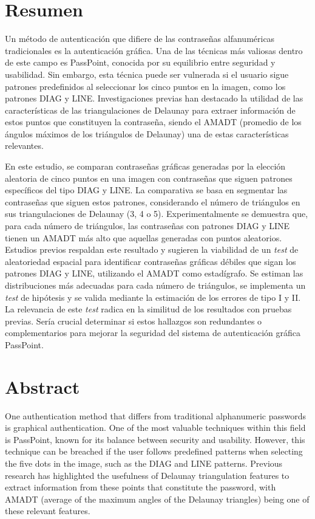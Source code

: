 \documentclass[12pt]{report}
\begin{document}
\chapter*{Resumen}
\hypertarget{Resumen}{}

	Un método de autenticación que difiere de las contraseñas alfanuméricas tradicionales es la autenticación gráfica. Una de las técnicas más valiosas dentro de este campo es PassPoint, conocida por su equilibrio entre seguridad y usabilidad. Sin embargo, esta técnica puede ser vulnerada si el usuario sigue patrones predefinidos al seleccionar los cinco puntos en la imagen, como los patrones DIAG y LINE. Investigaciones previas han destacado la utilidad de las características de las triangulaciones de Delaunay para extraer información de estos puntos que constituyen la contraseña, siendo el AMADT (promedio de los ángulos máximos de los triángulos de Delaunay) una de estas características relevantes.
	
	En este estudio, se comparan contraseñas gráficas generadas por la elección aleatoria de cinco puntos en una imagen con contraseñas que siguen patrones específicos del tipo DIAG y LINE. La comparativa se basa en segmentar las contraseñas que siguen estos patrones, considerando el número de triángulos en sus triangulaciones de Delaunay (3, 4 o 5). Experimentalmente se demuestra que, para cada número de triángulos, las contraseñas con patrones DIAG y LINE tienen un AMADT más alto que aquellas generadas con puntos aleatorios. Estudios previos respaldan este resultado y sugieren la viabilidad de un \textit{test} de aleatoriedad espacial para identificar contraseñas gráficas débiles que sigan los patrones DIAG y LINE, utilizando el AMADT como estadígrafo. Se estiman las distribuciones más adecuadas para cada número de triángulos, se implementa un \textit{test} de hipótesis y se valida mediante la estimación de los errores de tipo I y II. La relevancia de este \textit{test} radica en la similitud de los resultados con pruebas previas. Sería crucial determinar si estos hallazgos son redundantes o complementarios para mejorar la seguridad del sistema de autenticación gráfica PassPoint.


\chapter*{Abstract}
\hypertarget{Abstract}{}
	
	One authentication method that differs from traditional alphanumeric passwords is graphical authentication. One of the most valuable techniques within this field is PassPoint, known for its balance between security and usability. However, this technique can be breached if the user follows predefined patterns when selecting the five dots in the image, such as the DIAG and LINE patterns. Previous research has highlighted the usefulness of Delaunay triangulation features to extract information from these points that constitute the password, with AMADT (average of the maximum angles of the Delaunay triangles) being one of these relevant features.
	
\end{document}
